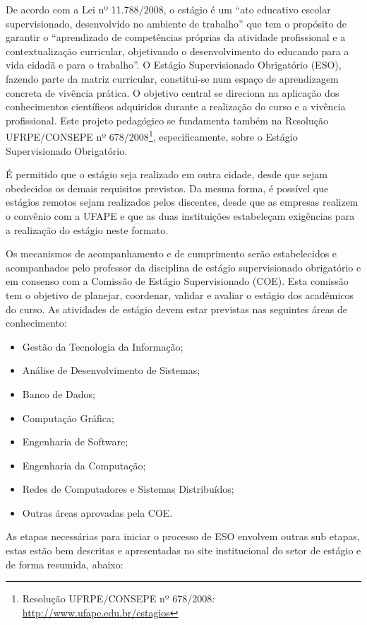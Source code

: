 \documentclass[
	12pt,				%
	openright,			%
  oneside,     %
	a4paper,			%
	english,			%
	french,				%
	spanish,			%
	brazil				%
	]{abntex2}
\begin{document}
De acordo com a Lei nº 11.788/2008, o estágio é um ``ato educativo escolar supervisionado, desenvolvido no ambiente de trabalho'' que tem o propósito de garantir o ``aprendizado de competências próprias da atividade profissional e a contextualização curricular, objetivando o desenvolvimento do educando para a vida cidadã e para o trabalho''. O Estágio Supervisionado Obrigatório (ESO), fazendo parte da matriz curricular, constitui-se num espaço de aprendizagem concreta de vivência prática. O objetivo central se direciona na aplicação dos conhecimentos científicos adquiridos durante a realização do curso e a vivência profissional. Este projeto pedagógico se fundamenta também na Resolução UFRPE/CONSEPE nº 678/2008\footnote{Resolução UFRPE/CONSEPE nº 678/2008: \url{http://www.ufape.edu.br/estagios}}, especificamente, sobre o Estágio Supervisionado Obrigatório.

É permitido que o estágio seja realizado em outra cidade, desde que sejam obedecidos os demais requisitos previstos. Da mesma forma, é possível que estágios remotos sejam realizados pelos discentes, desde que as empresas realizem o convênio com a UFAPE e que as duas instituições estabeleçam exigências para a realização do estágio neste formato.

Os mecanismos de acompanhamento e de cumprimento serão estabelecidos e acompanhados pelo professor da disciplina de estágio supervisionado obrigatório e em consenso com a Comissão de Estágio Supervisionado (COE). Esta comissão tem o objetivo de planejar, coordenar, validar e avaliar o estágio dos acadêmicos do curso. As atividades de estágio devem estar previstas nas seguintes áreas de conhecimento:

\begin{itemize}
    \item Gestão da Tecnologia da Informação;
    \item Análise de Desenvolvimento de Sistemas;
    \item Banco de Dados;
    \item  Computação Gráfica;
    \item  Engenharia de Software;
    \item  Engenharia da Computação;
    \item  Redes de Computadores e Sistemas Distribuídos;
    \item  Outras áreas aprovadas pela COE.
\end{itemize}

As etapas necessárias para iniciar o processo de ESO envolvem outras sub etapas, estas estão bem descritas e apresentadas no site institucional do setor de estágio e de forma resumida, abaixo:
\end{document}
